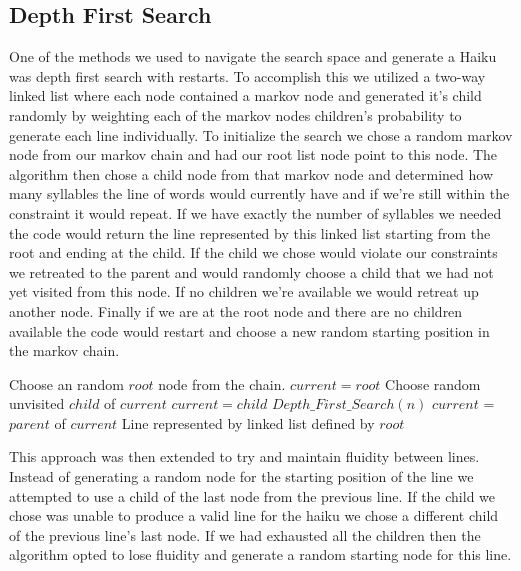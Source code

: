 \documentclass[]{article}
\begin{document}
\subsection{Depth First Search}
One of the methods we used to navigate the search space and generate a Haiku was depth first search with restarts. To accomplish this we utilized a two-way linked list where each node contained a markov node and generated it's child randomly by weighting each of the markov nodes children's probability to generate each line individually. To initialize the search we chose a random markov node from our markov chain and had our root list node point to this node. The algorithm then chose a child node from that markov node and determined how many syllables the line of words would currently have and if we're still within the constraint it would repeat. If we have exactly the number of syllables we needed the code would return the line represented by this linked list starting from the root and ending at the child. If the child we chose would violate our constraints we retreated to the parent and would randomly choose a child that we had not yet visited from this node. If no children we're available we would retreat up another node. Finally if we are at the root node and there are no children available the code would restart and choose a new random starting position in the markov chain.

\begin{algorithm}[H]
	\caption{$Depth\_First\_Search(n)$} \label{DFSB}
	\begin{algorithmic}[1]
		\State Choose an random $root$ node from the chain.
		\State $current = root$
				\State Choose random unvisited $child$ of $current$
					\State $current = child$
				\EndIf
			\Else
					\Return $Depth\_First\_Search(n)$
				\Else
					\State $current$ = $parent$ of $current$
				\EndIf
			\EndIf
		\EndWhile
		\Return Line represented by linked list defined by $root$
	\end{algorithmic}
\end{algorithm}

This approach was then extended to try and maintain fluidity between lines. Instead of generating a random node for the starting position of the line we attempted to use a child of the last node from the previous line. If the child we chose was unable to produce a valid line for the haiku we chose a different child of the previous line's last node. If we had exhausted all the children then the algorithm opted to lose fluidity and generate a random starting node for this line.
\end{document}
